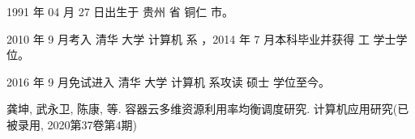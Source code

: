 \begin{resume}


 1991 年 04 月 27 日出生于 贵州 省 铜仁 市。

  2010 年 9 月考入 清华 大学 计算机 系 ，2014 年 7 月本科毕业并获得 工 学士学位。

  2016 年 9 月免试进入 清华 大学 计算机 系攻读 硕士 学位至今。


\begin{publications}
	\item 龚坤, 武永卫, 陈康, 等. 容器云多维资源利用率均衡调度研究. 计算机应用研究(已被录用, 2020第37卷第4期)
\end{publications}

\end{resume}
